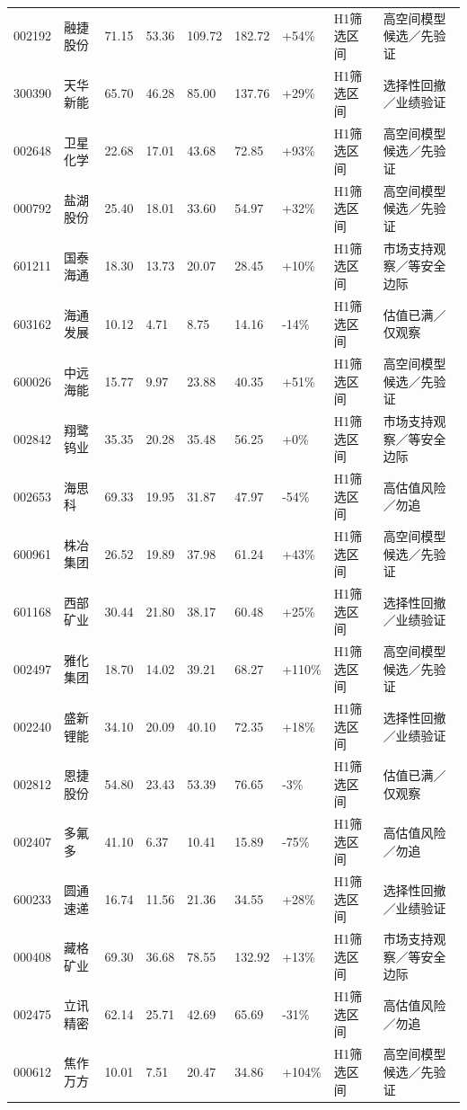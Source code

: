 \begin{longtable}{L{1.05cm}L{1.55cm}R{0.95cm}R{0.95cm}R{1.05cm}R{0.95cm}R{0.95cm}L{2.15cm}L{2.55cm}}
002192 & 融捷股份 & 71.15 & 53.36 & 109.72 & 182.72 & +54\% & H1筛选区间 & 高空间模型候选／先验证 \\
300390 & 天华新能 & 65.70 & 46.28 & 85.00 & 137.76 & +29\% & H1筛选区间 & 选择性回撤／业绩验证 \\
002648 & 卫星化学 & 22.68 & 17.01 & 43.68 & 72.85 & +93\% & H1筛选区间 & 高空间模型候选／先验证 \\
000792 & 盐湖股份 & 25.40 & 18.01 & 33.60 & 54.97 & +32\% & H1筛选区间 & 高空间模型候选／先验证 \\
601211 & 国泰海通 & 18.30 & 13.73 & 20.07 & 28.45 & +10\% & H1筛选区间 & 市场支持观察／等安全边际 \\
603162 & 海通发展 & 10.12 & 4.71 & 8.75 & 14.16 & -14\% & H1筛选区间 & 估值已满／仅观察 \\
600026 & 中远海能 & 15.77 & 9.97 & 23.88 & 40.35 & +51\% & H1筛选区间 & 高空间模型候选／先验证 \\
002842 & 翔鹭钨业 & 35.35 & 20.28 & 35.48 & 56.25 & +0\% & H1筛选区间 & 市场支持观察／等安全边际 \\
002653 & 海思科 & 69.33 & 19.95 & 31.87 & 47.97 & -54\% & H1筛选区间 & 高估值风险／勿追 \\
600961 & 株冶集团 & 26.52 & 19.89 & 37.98 & 61.24 & +43\% & H1筛选区间 & 高空间模型候选／先验证 \\
601168 & 西部矿业 & 30.44 & 21.80 & 38.17 & 60.48 & +25\% & H1筛选区间 & 选择性回撤／业绩验证 \\
002497 & 雅化集团 & 18.70 & 14.02 & 39.21 & 68.27 & +110\% & H1筛选区间 & 高空间模型候选／先验证 \\
002240 & 盛新锂能 & 34.10 & 20.09 & 40.10 & 72.35 & +18\% & H1筛选区间 & 选择性回撤／业绩验证 \\
002812 & 恩捷股份 & 54.80 & 23.43 & 53.39 & 76.65 & -3\% & H1筛选区间 & 估值已满／仅观察 \\
002407 & 多氟多 & 41.10 & 6.37 & 10.41 & 15.89 & -75\% & H1筛选区间 & 高估值风险／勿追 \\
600233 & 圆通速递 & 16.74 & 11.56 & 21.36 & 34.55 & +28\% & H1筛选区间 & 选择性回撤／业绩验证 \\
000408 & 藏格矿业 & 69.30 & 36.68 & 78.55 & 132.92 & +13\% & H1筛选区间 & 市场支持观察／等安全边际 \\
002475 & 立讯精密 & 62.14 & 25.71 & 42.69 & 65.69 & -31\% & H1筛选区间 & 高估值风险／勿追 \\
000612 & 焦作万方 & 10.01 & 7.51 & 20.47 & 34.86 & +104\% & H1筛选区间 & 高空间模型候选／先验证 \\

\end{longtable}

